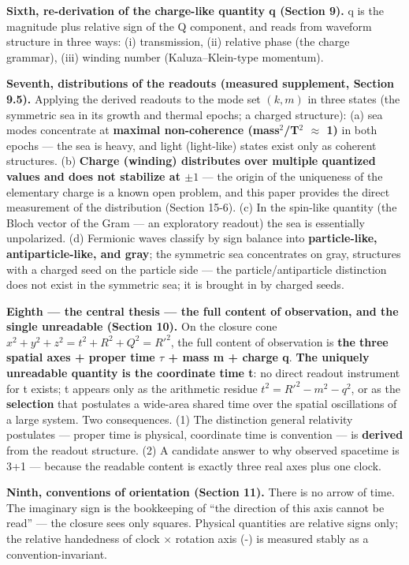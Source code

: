 \documentclass[
  a4paper,
]{article}
\begin{document}
\textbf{Sixth, re-derivation of the charge-like quantity q (Section 9).}
q is the magnitude plus relative sign of the Q component, and reads from
waveform structure in three ways: (i) transmission, (ii) relative phase
(the charge grammar), (iii) winding number (Kaluza--Klein-type
momentum).

\textbf{Seventh, distributions of the readouts (measured supplement,
Section 9.5).} Applying the derived readouts to the mode set \((k,m)\)
in three states (the symmetric sea in its growth and thermal epochs; a
charged structure): (a) sea modes concentrate at \textbf{maximal
non-coherence (mass\(^2\)/T\(^2\) \(\approx\) 1)} in both epochs --- the
sea is heavy, and light (light-like) states exist only as coherent
structures. (b) \textbf{Charge (winding) distributes over multiple
quantized values and does not stabilize at \(\pm 1\)} --- the origin of
the uniqueness of the elementary charge is a known open problem, and
this paper provides the direct measurement of the distribution (Section
15-6). (c) In the spin-like quantity (the Bloch vector of the Gram ---
an exploratory readout) the sea is essentially unpolarized. (d)
Fermionic waves classify by sign balance into \textbf{particle-like,
antiparticle-like, and gray}; the symmetric sea concentrates on gray,
structures with a charged seed on the particle side --- the
particle/antiparticle distinction does not exist in the symmetric sea;
it is brought in by charged seeds.

\textbf{Eighth --- the central thesis --- the full content of
observation, and the single unreadable (Section 10).} On the closure
cone \(x^2+y^2+z^2 = t^2+R^2+Q^2 = R'^2\), the full content of
observation is \textbf{the three spatial axes + proper time \(\tau\) +
mass m + charge q}. \textbf{The uniquely unreadable quantity is the
coordinate time t}: no direct readout instrument for t exists; t appears
only as the arithmetic residue \(t^2=R'^2-m^2-q^2\), or as the
\textbf{selection} that postulates a wide-area shared time over the
spatial oscillations of a large system. Two consequences. (1) The
distinction general relativity postulates --- proper time is physical,
coordinate time is convention --- is \textbf{derived} from the readout
structure. (2) A candidate answer to why observed spacetime is 3+1 ---
because the readable content is exactly three real axes plus one clock.

\textbf{Ninth, conventions of orientation (Section 11).} There is no
arrow of time. The imaginary sign is the bookkeeping of ``the direction
of this axis cannot be read'' --- the closure sees only squares.
Physical quantities are relative signs only; the relative handedness of
clock \(\times\) rotation axis (-) is measured stably as a
convention-invariant.
\end{document}
